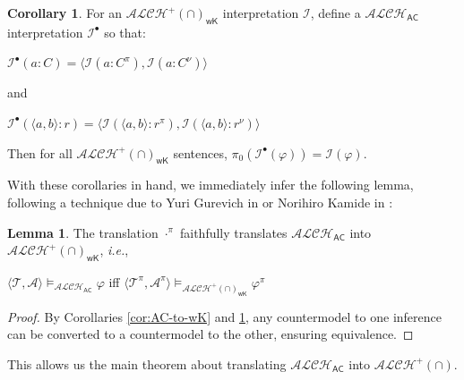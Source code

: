 \documentclass[letterpaper]{article} %
\theoremstyle{definition}
\newtheorem{lemma}{Lemma}
\theoremstyle{definition}
\theoremstyle{definition}
\theoremstyle{definition}
\theoremstyle{definition}
\newtheorem{corollary}[theorem]{Corollary}
\begin{document}
\begin{corollary}\label{cor:wk-to-AC}
    For an $\mathcal{ALCH}^+(\cap)_{\mathsf{wK}}$ interpretation $\mathcal{I}$, define a $\mathcal{ALCH}_{\mathsf{AC}}$ interpretation $\mathcal{I}^{\bullet}$ so that:

    \begin{center}
        $\mathcal{I}^{\bullet}(a:C)=\langle\mathcal{I}(a:C^{\pi}),\mathcal{I}(a:C^{\nu})\rangle$
    \end{center}

    \noindent and

    \begin{center}
        $\mathcal{I}^{\bullet}(\langle a,b\rangle:r)=\langle\mathcal{I}(\langle a,b\rangle:r^{\pi}),\mathcal{I}(\langle a,b\rangle:r^{\nu})\rangle$
    \end{center}

    \noindent Then for all $\mathcal{ALCH}^+(\cap)_{\mathsf{wK}}$ sentences, $\pi_{0}(\mathcal{I}^{\bullet}(\varphi))=\mathcal{I}(\varphi)$.
\end{corollary}

\noindent With these corollaries in hand, we immediately infer the following lemma, following a technique due to Yuri Gurevich in \cite{gurevich1977} or Norihiro Kamide in \cite{kamide2010}:

\begin{lemma}\label{lem:alch-ac-to-alh-wk}
    The translation $\cdot^{\pi}$ faithfully translates $\mathcal{ALCH}_{\mathsf{AC}}$ into $\mathcal{ALCH}^+(\cap)_{\mathsf{wK}}$, \emph{i.e.},

    \begin{center}
        $\langle\mathcal{T},\mathcal{A}\rangle\vDash_{\mathcal{ALCH}_{\mathsf{AC}}}\varphi$ iff $\langle\mathcal{T}^{\pi},\mathcal{A}^{\pi}\rangle\vDash_{\mathcal{ALCH}^+(\cap)_{\mathsf{wK}}}\varphi^{\pi}$
    \end{center}
\end{lemma}

\begin{proof}
    By Corollaries \ref{cor:AC-to-wK} and \ref{cor:wk-to-AC}, any countermodel to one inference can be converted to a countermodel to the other, ensuring equivalence.
\end{proof}

\noindent This allows us the main theorem about translating $\mathcal{ALCH}_{\mathsf{AC}}$ into $\mathcal{ALCH}^+(\cap)$.
\end{document}
